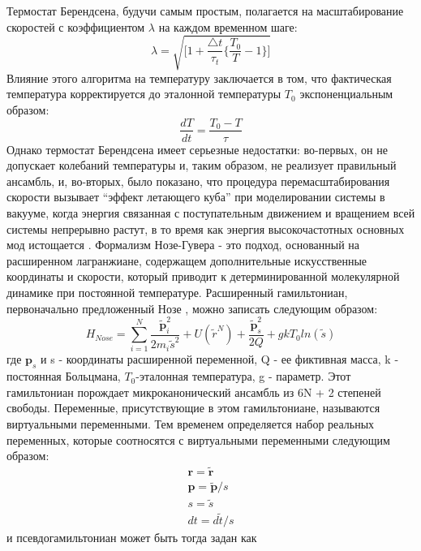     Термостат Берендсена, будучи самым простым, полагается на масштабирование скоростей с коэффициентом $\lambda$  на каждом временном шаге:
\begin{equation}
   \lambda= \sqrt{\Big[1+\frac{\triangle t}{\tau_t} \Big\{\frac{T_0}{T}-1  \Big\} \Big]}
\end{equation}
    Влияние этого алгоритма на температуру заключается в том, что фактическая температура корректируется до эталонной температуры $T_0$ экспоненциальным образом:
\begin{equation}
    \frac{dT}{dt}= \frac{T_0 - T}{\tau}
\end{equation}
Однако термостат Берендсена имеет серьезные недостатки: во-первых, он не допускает колебаний температуры и, таким образом, не реализует правильный ансамбль, и, во-вторых, было показано, что процедура перемасштабирования скорости вызывает ``эффект летающего куба'' при моделировании системы в вакууме, когда энергия связанная с поступательным движением и вращением всей системы непрерывно растут, в то время как энергия высокочастотных основных мод истощается \cite{harvey_flying_1998,golo_dynamic_2002}.
    Формализм Нозе-Гувера - это подход, основанный на расширенном лагранжиане, содержащем дополнительные искусственные координаты и скорости, который приводит к детерминированной молекулярной динамике при постоянной температуре. Расширенный гамильтониан, первоначально предложенный Нозе \cite{nose_molecular_1984}, можно записать следующим образом:
\begin{equation}
    H_{Nose}= \sum_{i=1}^{N} \frac{\tilde {\mathbf p}_{i}^{2}}{2 m_i \tilde s^2} + U (\tilde r^N) + \frac{\tilde {\mathbf p}_{s}^{2}}{2Q} + g k T_0 ln(\tilde s)
\end{equation}
    где ${\mathbf p}_s$ и s - координаты расширенной переменной, Q - ее фиктивная масса, k - постоянная Больцмана, $T_0$-эталонная температура, g - параметр. Этот гамильтониан порождает микроканонический ансамбль из 6N + 2 степеней свободы. Переменные, присутствующие в этом гамильтониане, называются виртуальными переменными. Тем временем определяется набор реальных переменных, которые соотносятся с виртуальными переменными следующим образом:
\begin{eqnarray}
    {\mathbf r}= \tilde {\mathbf r} \\
    {\mathbf p}= \tilde {\mathbf p} /s \\
    s= \tilde s \\
    dt=d \tilde t / s
\end{eqnarray}
    и псевдогамильтониан может быть тогда задан как 

